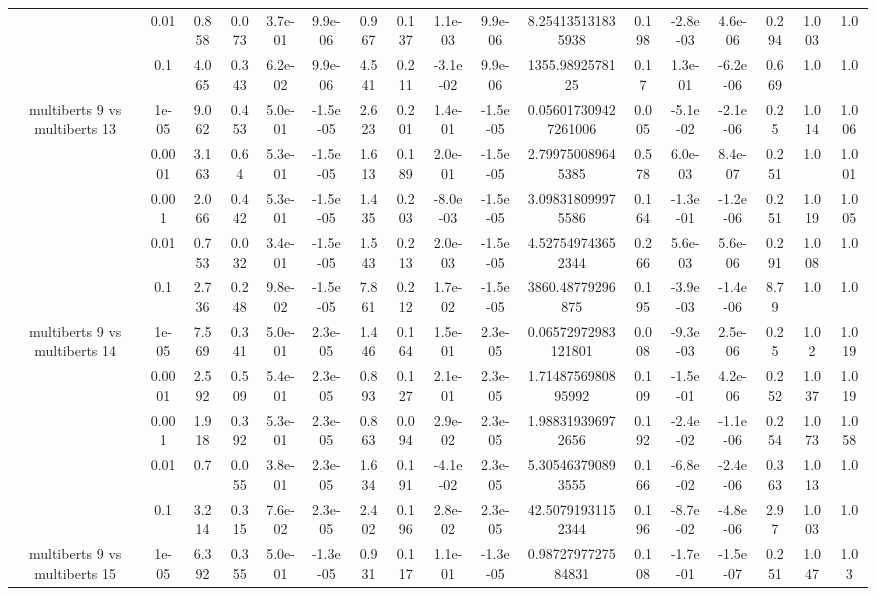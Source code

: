 \begin{tabular}{|c|c|c|c|c|c|c|c|c|c|c|c|c|c|c|c|c|}
 & 0.01 & 0.858 & 0.073 & 3.7e-01 & 9.9e-06 & 0.967 & 0.137 & 1.1e-03 & 9.9e-06 & 8.254135131835938 & 0.198 & -2.8e-03 & 4.6e-06 & 0.294 & 1.003 & 1.0 \\
 & 0.1 & 4.065 & 0.343 & 6.2e-02 & 9.9e-06 & 4.541 & 0.211 & -3.1e-02 & 9.9e-06 & 1355.9892578125 & 0.17 & 1.3e-01 & -6.2e-06 & 0.669 & 1.0 & 1.0 \\
\hline
\multirow{5}{*}{multiberts 9 vs multiberts 13} & 1e-05 & 9.062 & 0.453 & 5.0e-01 & -1.5e-05 & 2.623 & 0.201 & 1.4e-01 & -1.5e-05 & 0.056017309427261006 & 0.005 & -5.1e-02 & -2.1e-06 & 0.25 & 1.014 & 1.006 \\
 & 0.0001 & 3.163 & 0.64 & 5.3e-01 & -1.5e-05 & 1.613 & 0.189 & 2.0e-01 & -1.5e-05 & 2.799750089645385 & 0.578 & 6.0e-03 & 8.4e-07 & 0.251 & 1.0 & 1.001 \\
 & 0.001 & 2.066 & 0.442 & 5.3e-01 & -1.5e-05 & 1.435 & 0.203 & -8.0e-03 & -1.5e-05 & 3.098318099975586 & 0.164 & -1.3e-01 & -1.2e-06 & 0.251 & 1.019 & 1.005 \\
 & 0.01 & 0.753 & 0.032 & 3.4e-01 & -1.5e-05 & 1.543 & 0.213 & 2.0e-03 & -1.5e-05 & 4.527549743652344 & 0.266 & 5.6e-03 & 5.6e-06 & 0.291 & 1.008 & 1.0 \\
 & 0.1 & 2.736 & 0.248 & 9.8e-02 & -1.5e-05 & 7.861 & 0.212 & 1.7e-02 & -1.5e-05 & 3860.48779296875 & 0.195 & -3.9e-03 & -1.4e-06 & 8.79 & 1.0 & 1.0 \\
\hline
\multirow{5}{*}{multiberts 9 vs multiberts 14} & 1e-05 & 7.569 & 0.341 & 5.0e-01 & 2.3e-05 & 1.446 & 0.164 & 1.5e-01 & 2.3e-05 & 0.06572972983121801 & 0.008 & -9.3e-03 & 2.5e-06 & 0.25 & 1.02 & 1.019 \\
 & 0.0001 & 2.592 & 0.509 & 5.4e-01 & 2.3e-05 & 0.893 & 0.127 & 2.1e-01 & 2.3e-05 & 1.7148756980895992 & 0.109 & -1.5e-01 & 4.2e-06 & 0.252 & 1.037 & 1.019 \\
 & 0.001 & 1.918 & 0.392 & 5.3e-01 & 2.3e-05 & 0.863 & 0.094 & 2.9e-02 & 2.3e-05 & 1.988319396972656 & 0.192 & -2.4e-02 & -1.1e-06 & 0.254 & 1.073 & 1.058 \\
 & 0.01 & 0.7 & 0.055 & 3.8e-01 & 2.3e-05 & 1.634 & 0.191 & -4.1e-02 & 2.3e-05 & 5.305463790893555 & 0.166 & -6.8e-02 & -2.4e-06 & 0.363 & 1.013 & 1.0 \\
 & 0.1 & 3.214 & 0.315 & 7.6e-02 & 2.3e-05 & 2.402 & 0.196 & 2.8e-02 & 2.3e-05 & 42.50791931152344 & 0.196 & -8.7e-02 & -4.8e-06 & 2.97 & 1.003 & 1.0 \\
\hline
\multirow{5}{*}{multiberts 9 vs multiberts 15} & 1e-05 & 6.392 & 0.355 & 5.0e-01 & -1.3e-05 & 0.931 & 0.117 & 1.1e-01 & -1.3e-05 & 0.9872797727584831 & 0.108 & -1.7e-01 & -1.5e-07 & 0.251 & 1.047 & 1.03 \\

\end{tabular}
